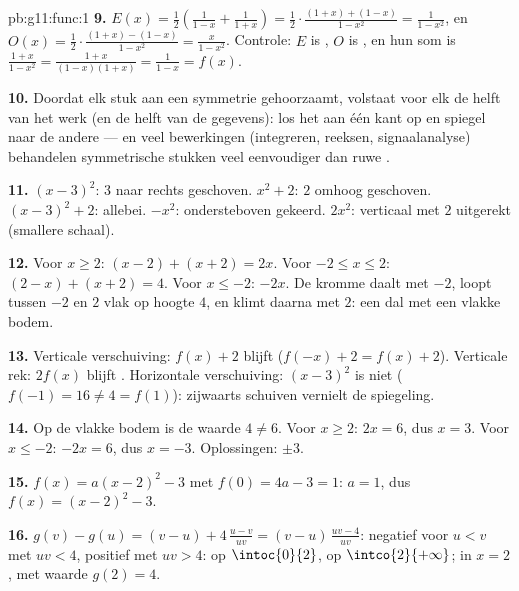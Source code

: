 \begin{solution}{pb:g11:func:1}
\textbf{9.} $E(x) = \frac12\left(\frac{1}{1 - x} + \frac{1}{1 + x}\right)
= \frac12 \cdot \frac{(1 + x) + (1 - x)}{1 - x^2} = \frac{1}{1 - x^2}$, en
$O(x) = \frac12 \cdot \frac{(1 + x) - (1 - x)}{1 - x^2} =
\frac{x}{1 - x^2}$. Controle: $E$ is , $O$ is , en hun som is
$\frac{1 + x}{1 - x^2} = \frac{1 + x}{(1 - x)(1 + x)} = \frac{1}{1 - x} =
f(x)$.

\textbf{10.} Doordat elk stuk aan een symmetrie gehoorzaamt, volstaat voor
elk de helft van het werk (en de helft van de gegevens): los het aan één
kant op en spiegel naar de andere --- en veel bewerkingen (integreren,
reeksen, signaalanalyse) behandelen symmetrische stukken veel eenvoudiger
dan ruwe .

\textbf{11.} $(x-3)^2$: $3$ naar rechts geschoven. $x^2 + 2$: $2$ omhoog
geschoven. $(x-3)^2 + 2$: allebei. $-x^2$: ondersteboven gekeerd. $2x^2$:
verticaal met $2$ uitgerekt (smallere schaal).

\textbf{12.} Voor $x \geq 2$: $(x - 2) + (x + 2) = 2x$. Voor
$-2 \leq x \leq 2$: $(2 - x) + (x + 2) = 4$. Voor $x \leq -2$: $-2x$. De
kromme daalt met  $-2$, loopt tussen $-2$ en $2$ vlak op
hoogte $4$, en klimt daarna met  $2$: een dal met een
vlakke bodem.

\textbf{13.} Verticale verschuiving: $f(x) + 2$ blijft 
($f(-x) + 2 = f(x) + 2$). Verticale rek: $2f(x)$ blijft . Horizontale
verschuiving: $(x - 3)^2$ is niet  ($f(-1) = 16 \neq 4 = f(1)$):
zijwaarts schuiven vernielt de spiegeling.

\textbf{14.} Op de vlakke bodem is de waarde $4 \neq 6$. Voor $x \geq 2$:
$2x = 6$, dus $x = 3$. Voor $x \leq -2$: $-2x = 6$, dus $x = -3$.
Oplossingen: $\pm 3$.

\textbf{15.} $f(x) = a(x - 2)^2 - 3$ met $f(0) = 4a - 3 = 1$: $a = 1$, dus
$f(x) = (x - 2)^2 - 3$.

\textbf{16.} $g(v) - g(u) = (v - u) + 4\,\frac{u - v}{uv}
= (v - u)\,\frac{uv - 4}{uv}$: negatief voor $u < v$ met $uv < 4$, positief
met $uv > 4$:  op $\intoc{0}{2}$,  op $\intco{2}{+\infty}$;
 in $x = 2$, met waarde $g(2) = 4$.


\end{solution}
